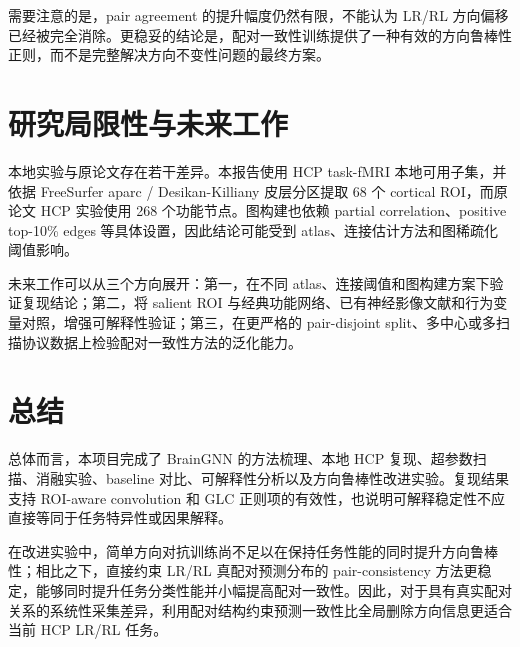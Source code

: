 需要注意的是，pair agreement 的提升幅度仍然有限，不能认为 LR/RL 方向偏移已经被完全消除。更稳妥的结论是，配对一致性训练提供了一种有效的方向鲁棒性正则，而不是完整解决方向不变性问题的最终方案。

\section{研究局限性与未来工作}

本地实验与原论文存在若干差异。本报告使用 HCP task-fMRI 本地可用子集，并依据 FreeSurfer aparc / Desikan-Killiany 皮层分区提取 68 个 cortical ROI，而原论文 HCP 实验使用 268 个功能节点。图构建也依赖 partial correlation、positive top-10\% edges 等具体设置，因此结论可能受到 atlas、连接估计方法和图稀疏化阈值影响。

未来工作可以从三个方向展开：第一，在不同 atlas、连接阈值和图构建方案下验证复现结论；第二，将 salient ROI 与经典功能网络、已有神经影像文献和行为变量对照，增强可解释性验证；第三，在更严格的 pair-disjoint split、多中心或多扫描协议数据上检验配对一致性方法的泛化能力。

\section{总结}

总体而言，本项目完成了 BrainGNN 的方法梳理、本地 HCP 复现、超参数扫描、消融实验、baseline 对比、可解释性分析以及方向鲁棒性改进实验。复现结果支持 ROI-aware convolution 和 GLC 正则项的有效性，也说明可解释稳定性不应直接等同于任务特异性或因果解释。

在改进实验中，简单方向对抗训练尚不足以在保持任务性能的同时提升方向鲁棒性；相比之下，直接约束 LR/RL 真配对预测分布的 pair-consistency 方法更稳定，能够同时提升任务分类性能并小幅提高配对一致性。因此，对于具有真实配对关系的系统性采集差异，利用配对结构约束预测一致性比全局删除方向信息更适合当前 HCP LR/RL 任务。
